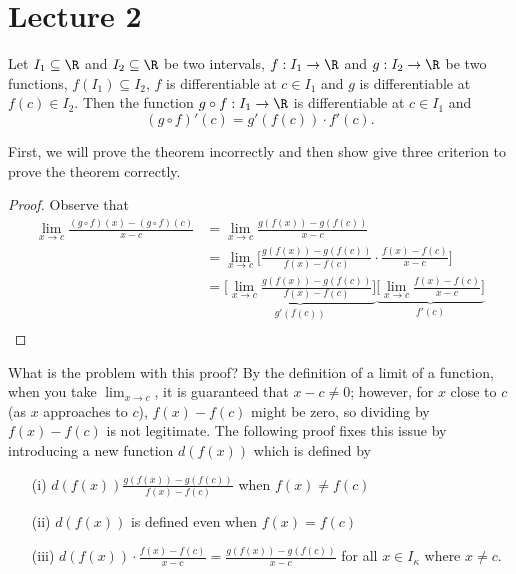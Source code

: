 
\section{Lecture 2}

\begin{theorem}
    Let \( {I}_{1} \subseteq  \R  \) and \( {I}_{2} \subseteq  \R   \) be two intervals, \( f: {I}_{1} \to \R  \) and \( g : {I}_{2} \to \R  \) be two functions, \( f({I}_{1}) \subseteq  {I}_{2} \), \( f \) is differentiable at \( c \in {I}_{1} \) and \( g  \) is differentiable at \( f(c) \in {I}_{2} \). Then the function \( g \circ f : {I}_{1} \to \R  \) is differentiable at \( c \in {I}_{1} \) and 
    \[  (g \circ f)'(c) = g'(f(c)) \cdot f'(c). \]
\end{theorem}
First, we will prove the theorem incorrectly and then show give three criterion to prove the theorem correctly.  

\begin{proof}
Observe that 
\begin{align*}
    \lim_{ x \to c  }  \frac{ (g \circ f)(x) - (g \circ f)(c) }{x - c } &= \lim_{ x \to c  }  \frac{ g(f(x)) - g(f(c)) }{  x - c  }  \\
                                                                        &= \lim_{ x \to c  }  \Big[ \frac{ g(f(x)) - g(f(c)) }{  f(x) - f(c) } \cdot \frac{ f(x) - f(c) }{  x - c   } \Big] \\
                                                                        &= \underbrace{\Big[ \lim_{ x \to c  }  \frac{ g(f(x)) - g(f(c)) }{  f(x) - f(c) } \Big]}_{g'(f(c))} \underbrace{\Big[ \lim_{ x \to c  }  \frac{ f(x)  - f(c) }{  x - c  } \Big]}_{f'(c)} \\
\end{align*}
\end{proof}
What is the problem with this proof? By the definition of a limit of a function, when you take \( \lim_{ x \to c  }  \), it is guaranteed that \( x - c \neq 0   \); however, for \( x  \) close to \( c  \) (as \( x  \) approaches to \( c  \)), \( f(x)- f(c) \) might be zero, so dividing by \( f(x) - f(c) \) is not legitimate. The following proof fixes this issue by introducing a new function \( d(f(x)) \) which is defined by
\begin{enumerate}
    \item[(i)] \( d(f(x)) \displaystyle \frac{ g(f(x)) - g(f(c)) }{  f(x) - f(c) }    \) when \( f(x) \neq f(c) \) 
    \item[(ii)] \( d(f(x))  \) is defined even when \( f(x) = f(c) \)  
    \item[(iii)] \( \displaystyle d(f(x)) \cdot \frac{ f(x) - f(c) }{  x - c  }  = \frac{ g(f(x)) - g(f(c)) }{  x - c  }   \) for all \( x \in {I}_{\kappa} \) where \( x \neq c   \).
\end{enumerate}

